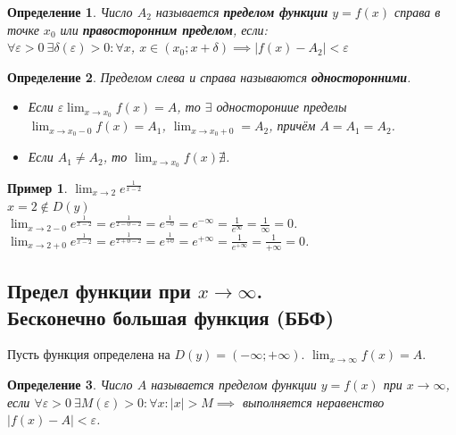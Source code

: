 \documentclass[12pt, a4paper]{article}
\newtheorem{definition}{Определение}[subsection]
\newtheorem{example}{Пример}[subsection]
\theoremstyle{remark}
\newcommand{\Y}{\mathbb{\forall}}
\newcommand{\F}{\mathbb{\exists}}
\newcommand{\E}{\mathbb{\varepsilon}}
\begin{document}
	\begin{definition}
		Число $A_2$ называется \textbf{пределом функции} $y = f(x)$ справа в точке $x_0$ или \textbf{правосторонним пределом}, если: \\ $\Y\E > 0 \ \F\delta(\E) > 0: \Y x$, $x \in (x_0; x + \delta) \implies |f(x) - A_2| < \E$
	\end{definition}
	
	\begin{definition}
		Пределом слева и справа называются \textbf{односторонними}. 
		\begin{itemize}
			\item Если $\E \lim_{x \to x_0} f(x) = A$, то $\F$ односторониие пределы $\lim_{x \to x_0 - 0} f(x) = A_1$, $\lim_{x \to x_0 + 0} = A_2$, причём $A = A_1 = A_2$.
			
			\item Если $A_1 \neq A_2$, то $\lim_{x \to x_0} f(x) \nexists$.
		\end{itemize}
	\end{definition}
	
	\begin{example}
		$\lim_{x \to 2} e^{\frac{1}{x - 2}}$ \\
		$x = 2 \notin D(y)$ \\
		$\lim_{x \to 2 - 0} e^{\frac{1}{x - 2}} = e^{\frac{1}{2 - 0 - 2}} = e^{\frac{1}{-0}} = e^{-\infty} = \frac{1}{e^\infty} = \frac{1}{\infty} = 0$. \\ 
		$\lim_{x \to 2 + 0} e^\frac{1}{x - 2} = e^{\frac{1}{2 + 0 - 2}} = e^\frac{1}{+0} = e^{+\infty} = \frac{1}{e^{+\infty}} = \frac{1}{+\infty} = 0$.
	\end{example}
	
	\newpage
	
	\subsection{Предел функции при $x \to \infty$. \\ Бесконечно большая функция (ББФ)}
	
	Пусть функция определена на $D(y) = (- \infty; + \infty)$. $\lim_{x \to \infty} f(x) = A$.
	
	\begin{definition}
		Число $A$ называется пределом функции $y = f(x)$ при $x \to \infty$, если $\Y\E > 0 \ \F M(\E) > 0: \Y x: |x| > M \implies$ выполняется неравенство $|f(x) - A| < \E$.
	\end{definition}
	\vspace{0.4cm}
	
\end{document}
